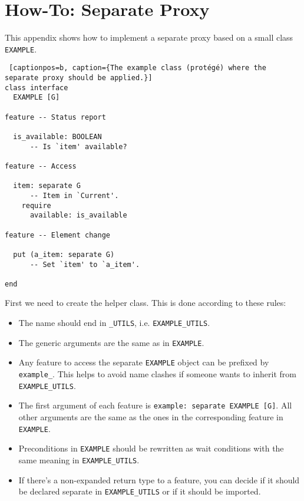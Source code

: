\section{How-To: Separate Proxy}
\label{sec:howto-separate-proxy}

This appendix shows how to implement a separate proxy based on a small class \lstinline!EXAMPLE!.

\begin{lstlisting} [captionpos=b, caption={The example class (protégé) where the separate proxy should be applied.}]
class interface
  EXAMPLE [G]

feature -- Status report

  is_available: BOOLEAN
      -- Is `item' available?
  
feature -- Access

  item: separate G
      -- Item in `Current'.
    require
      available: is_available

feature -- Element change

  put (a_item: separate G)
      -- Set `item' to `a_item'.

end
\end{lstlisting}

First we need to create the helper class.
This is done according to these rules:
 \begin{itemize}
  \item The name should end in \lstinline!_UTILS!, i.e. \lstinline!EXAMPLE_UTILS!.
  \item The generic arguments are the same as in \lstinline!EXAMPLE!.
  \item Any feature to access the separate \lstinline!EXAMPLE! object can be prefixed by \lstinline!example_!.
  This helps to avoid name clashes if someone wants to inherit from \lstinline!EXAMPLE_UTILS!.
  \item The first argument of each feature is \lstinline!example: separate EXAMPLE [G]!.
  All other arguments are the same as the ones in the corresponding feature in \lstinline!EXAMPLE!.
  \item Preconditions in \lstinline!EXAMPLE! should be rewritten as wait conditions with the same meaning in \lstinline!EXAMPLE_UTILS!.
  \item If there's a non-expanded return type to a feature, you can decide if it should be declared separate in \lstinline!EXAMPLE_UTILS! or if it should be imported.
 \end{itemize}

